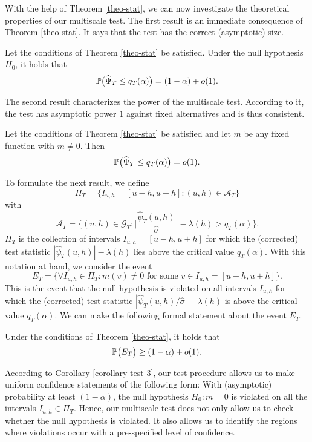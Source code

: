 \documentclass[a4paper,12pt]{article}
\numberwithin{equation}{section}
\begin{document}
With the help of Theorem \ref{theo-stat}, we can now investigate the theoretical properties of our multiscale test. The first result is an immediate consequence of Theorem \ref{theo-stat}. It says that the test has the correct (asymptotic) size. 
\begin{corollary}\label{corollary-test-1}
Let the conditions of Theorem \ref{theo-stat} be satisfied. Under the null hypothesis $H_0$, it holds that 
\[ \mathbb{P} \big( \widehat{\Psi}_T \le q_T(\alpha) \big) = (1 - \alpha) + o(1). \]
\end{corollary}
The second result characterizes the power of the multiscale test. According to it, the test has asymptotic power $1$ against fixed alternatives and is thus consistent. 
\begin{corollary}\label{corollary-test-2}
Let the conditions of Theorem \ref{theo-stat} be satisfied and let $m$ be any fixed function with $m \ne 0$. Then 
\[ \mathbb{P} \big( \widehat{\Psi}_T \le q_T(\alpha) \big) = o(1). \]
\end{corollary}
To formulate the next result, we define 
\begin{equation}\label{pi-set}
\Pi_T = \big\{ I_{u,h} = [u-h,u+h]: (u,h) \in \mathcal{A}_T \big\}
\end{equation}
with 
\begin{equation}\label{a-set}
\mathcal{A}_T = \Big\{ (u,h) \in \mathcal{G}_T: \Big|\frac{\widehat{\psi}_T(u,h)}{\widehat{\sigma}}\Big| - \lambda(h) > q_T(\alpha) \Big\}.
\end{equation}
$\Pi_T$ is the collection of intervals $I_{u,h} = [u-h,u+h]$ for which the (corrected) test statistic $|\widehat{\psi}_T(u,h)| - \lambda(h)$ lies above the critical value $q_T(\alpha)$. With this notation at hand, we consider the event 
\[ E_T = \Big\{ \forall I_{u,h} \in \Pi_T: m(v) \ne 0 \text{ for some } v \in I_{u,h} = [u-h,u+h] \Big\}. \]
This is the event that the null hypothesis is violated on all intervals $I_{u,h}$ for which the (corrected) test statistic $|\widehat{\psi}_T(u,h)/\widehat{\sigma}| - \lambda(h)$ is above the critical value $q_T(\alpha)$. We can make the following formal statement about the event $E_T$. 
\begin{corollary}\label{corollary-test-3}
Under the conditions of Theorem \ref{theo-stat}, it holds that  
\[ \mathbb{P} \big( E_T \big) \ge (1-\alpha) + o(1). \] 
\end{corollary}
According to Corollary \ref{corollary-test-3}, our test procedure allows us to make uniform confidence statements of the following form: With (asymptotic) probability at least $(1-\alpha)$, the null hypothesis $H_0: m = 0$ is violated on all the intervals $I_{u,h} \in \Pi_T$. Hence, our multiscale test does not only allow us to check whether the null hypothesis is violated. It also allows us to identify the regions where violations occur with a pre-specified level of confidence. 
 
\end{document}
